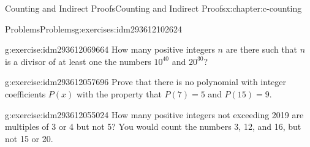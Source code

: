 \documentclass[twoside,10pt,]{book}
\numberwithin{equation}{section}
\begin{document}
\begin{chapterptx}{Counting and Indirect Proofs}{}{Counting and Indirect Proofs}{}{}{x:chapter:c-counting}
\begin{exercises-section}{Problems}{}{Problems}{}{}{g:exercises:idm293612102624}
\begin{divisionexercise}{7}{}{}{g:exercise:idm293612069664}
How many positive integers \(n\) are there such that \(n\) is a divisor of at least one the numbers \(10^{40}\) and \(20^{30}\)?%
\end{divisionexercise}%
\begin{divisionexercise}{8}{}{}{g:exercise:idm293612057696}%
Prove that there is no polynomial with integer coefficients \(P(x)\) with the property that \(P(7) = 5\) and \(P(15) = 9\).%
\end{divisionexercise}%
\begin{divisionexercise}{9}{}{}{g:exercise:idm293612055024}%
How many positive integers not exceeding 2019 are multiples of 3 or 4 but not 5? You would count the numbers 3, 12, and 16, but not 15 or 20.%
\end{divisionexercise}%
\end{exercises-section}
\end{chapterptx}
%
%
\typeout{************************************************}
\typeout{************************************************}
%
\end{document}
